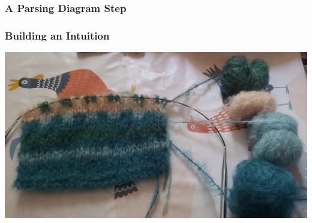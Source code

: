\documentclass[math, english, info]{beamercours}
\begin{document}
\begin{frame}
	\frametitle{A Parsing Diagram Step}
\end{frame}

\begin{frame}
	\frametitle{Building an Intuition}
	\centering
	\includegraphics[width=.7\textwidth]{aux/figures/knitting-example.jpeg}
\end{frame}
\end{document}
